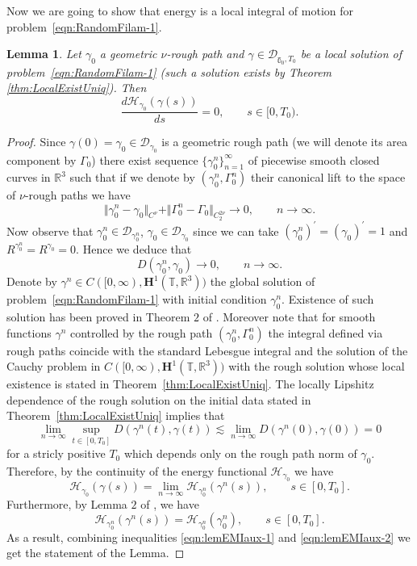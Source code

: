 \documentclass[11pt,a4paper,reqno]{amsart}%
\theoremstyle{plain}
\theoremstyle{remark}
\theoremstyle{plain}
\newtheorem{lemma}[theorem]{Lemma}
\numberwithin{equation}{section}
\def\Rnu{{\mathbb R}}
\def\liml{\lim\limits}
\def\supl{\sup\limits}
\def\supl{\mathop{\sup}\limits}
\begin{document}
Now we are going to show that energy is a local integral of motion
for problem~\eqref{eqn:RandomFilam-1}.
\begin{lemma}\label{lem:EnergyMotionIntegral}
Let $\gamma_0$ a geometric $\nu$-rough path and $\gamma\in\mathcal{D}_{\mathbb{\gamma}_0,T_0}$ be a local solution of
problem~\eqref{eqn:RandomFilam-1} (such a solution exists by Theorem \ref{thm:LocalExistUniq}). Then
$$
\frac{d\mathcal{H}_{\gamma_0}(\gamma(s))}{ds}=0,\qquad s\in[0,T_0).
$$
\end{lemma}
\begin{proof}%
Since $\gamma(0)=\gamma_0\in \mathcal{D}_{\gamma_0}$ is a geometric rough path (we will denote its area component by $\Gamma_0$)
there exist sequence $\{\gamma_0^n\}_{n=1}^{\infty}$ of piecewise smooth closed curves in $\Rnu^3$ such that if we denote by $(\gamma_0^n,\Gamma_0^n)$ their canonical lift to the space of $\nu$-rough paths we have
\[
\Vert \gamma_0^n-\gamma_0\Vert_{C^{\nu}}+\Vert \Gamma^n_0-{\Gamma}_0\Vert_{C_2^{2\nu}}\to 0,\qquad n\to\infty.
\]
Now observe that $\gamma_0^n\in \mathcal{D}_{\gamma_0^n}$, $\gamma_0\in \mathcal{D}_{\gamma_0}$ since we can take
$(\gamma_0^n)^\prime=(\gamma_0)^\prime=1$ and $R^{\gamma_0^n}=R^{\gamma_0}=0$.
Hence we deduce that
$$
D( \gamma_0^n,\gamma_0)\to 0,\qquad n\to\infty.
$$
Denote by $\gamma^n\in C([0,\infty),\mathbf{H}^1(\mathbb{T},\Rnu^3))$ the
global solution of problem~\eqref{eqn:RandomFilam-1} with initial
condition $\gamma_0^n$. Existence of such solution has been proved in
Theorem $2$ of \cite{[Bers+Gub_2007]}. Moreover note that for smooth functions $\gamma^n$ controlled by the rough path $(\gamma_0^n,\Gamma_0^n)$ the integral defined via rough paths coincide with the standard Lebesgue integral and the solution of the Cauchy problem in $C([0,\infty),\mathbf{H}^1(\mathbb{T},\Rnu^3))$ with the rough solution whose local existence is stated in Theorem~\ref{thm:LocalExistUniq}.   The locally Lipshitz dependence of the rough solution on  the initial data  stated in Theorem~\ref{thm:LocalExistUniq} implies that
$$
\lim_{n\to \infty} \supl_{t\in[0,T_0]}D( \gamma^n(t),\gamma(t)) \lesssim  \lim_{n\to \infty}  D( \gamma^n(0),\gamma(0))  =  0
$$
for a stricly positive $T_0$ which depends only on the rough path norm of $\gamma_0$.
Therefore, by the continuity of the energy functional $\mathcal{H}_{\gamma_0}$ we
have
\begin{equation}
\mathcal{H}_{\gamma_0}(\gamma(s))=\liml_{n\to\infty}\mathcal{H}_{\gamma_0^n}(\gamma^n(s)),\qquad s\in[0,T_0].\label{eqn:lemEMIaux-1}
\end{equation}
Furthermore, by Lemma $2$ of \cite{[Bers+Gub_2007]}, we
have
\begin{equation}
\mathcal{H}_{\gamma_0^n}(\gamma^n(s))=\mathcal{H}_{\gamma_0^n}(\gamma_0^n),\qquad s\in[0,T_0].\label{eqn:lemEMIaux-2}
\end{equation}
As a result, combining inequalities \eqref{eqn:lemEMIaux-1} and
\eqref{eqn:lemEMIaux-2} we get the statement of the Lemma.
\end{proof}
\end{document}
